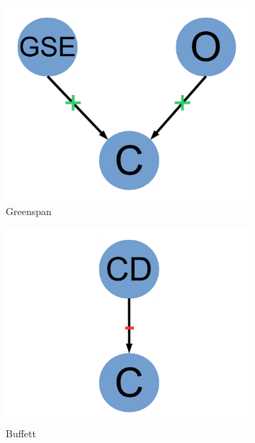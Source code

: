 \documentclass[12pt]{article}
\begin{document}
\begin{figure}
         \begin{subfigure}[b]{0.2\textwidth}
                \includegraphics[width=\textwidth]{greenspan.pdf}
                \caption{\footnotesize Greenspan}
                \label{fig:greenspan}
        \end{subfigure}
        \begin{subfigure}[b]{0.2\textwidth}
                \includegraphics[width=\textwidth]{buffett.pdf}
                \caption{\footnotesize Buffett}
                \label{fig:buffett}
        \end{subfigure}
        \begin{subfigure}[b]{0.2\textwidth}

\end{subfigure}
\end{figure}
\end{document}
